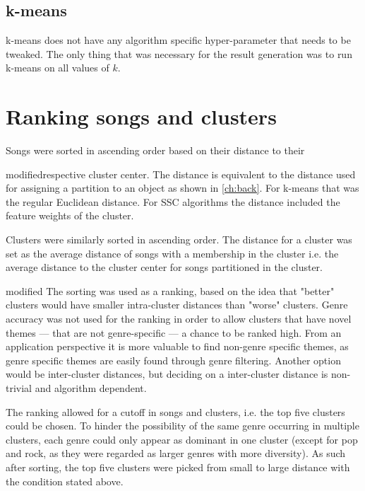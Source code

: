 \documentclass[../report.tex]{subfiles}
\begin{document}
\subsection{k-means}
k-means does not have any algorithm specific hyper-parameter that needs to be tweaked. The only thing that was necessary for the result generation was to run k-means on all values of $k$.

\section{Ranking songs and clusters}
Songs were sorted in ascending order based on their distance to their \begin{color}{modified}respective cluster center. The distance is equivalent to the distance used for assigning a partition to an object as shown in \cref{ch:back}. For k-means that was the regular Euclidean distance. For SSC algorithms the distance included the feature weights of the cluster. \end{color}

Clusters were similarly sorted in ascending order. The distance for a cluster was set as the average distance of songs with a membership in the cluster i.e. the average distance to the cluster center for songs partitioned in the cluster.
\begin{color}{modified}
The sorting was used as a ranking, based on the idea that "better" clusters would have smaller intra-cluster distances than "worse" clusters. Genre accuracy was not used for the ranking in order to allow clusters that have novel themes --- that are not genre-specific --- a chance to be ranked high. From an application perspective it is more valuable to find non-genre specific themes, as genre specific themes are easily found through genre filtering. Another option would be inter-cluster distances, but deciding on a inter-cluster distance is non-trivial and algorithm dependent.
\end{color}

The ranking allowed for a cutoff in songs and clusters, i.e. the top five clusters could be chosen. To hinder the possibility of the same genre occurring in multiple clusters, each genre could only appear as dominant in one cluster (except for pop and rock, as they were regarded as larger genres with more diversity). As such after sorting, the top five clusters were picked from small to large distance with the condition stated above.
\end{document}
